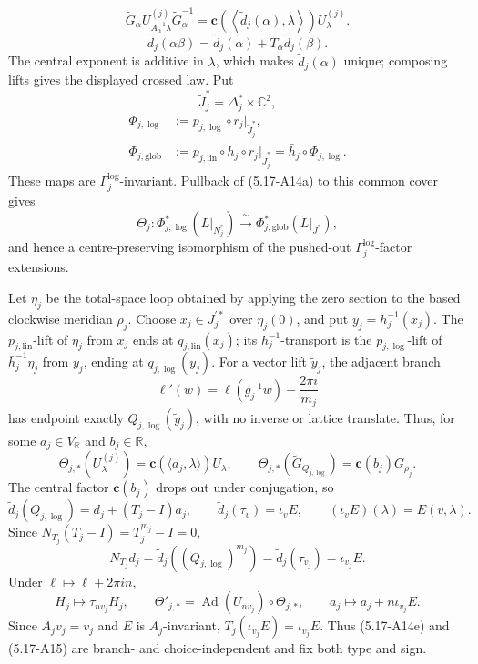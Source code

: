{\[
 \widetilde G_\alpha
 U_{A_\alpha^{-1}\lambda}^{(j)}\widetilde G_\alpha^{-1}
 =\mathbf c\!\left(\left\langle\widetilde d_j(\alpha),\lambda\right\rangle\right)
 U_\lambda^{(j)}.
\tag{5.17-A14c}
\]
\[
 \widetilde d_j(\alpha\beta)
 =\widetilde d_j(\alpha)+T_\alpha\widetilde d_j(\beta).
\tag{5.17-A14d}
\]
The central exponent is additive in \(\lambda\), which makes
\(\widetilde d_j(\alpha)\) unique; composing lifts gives the displayed
crossed law.  Put
\[
 \widetilde J_j^*=\Delta_j^*\times\mathbb C^2,
\]
\[
\begin{aligned}
 \Phi_{j,\log}
  &:=p_{j,\log}\circ r_j|_{\widetilde J_j^*},\\
 \Phi_{j,\mathrm{glob}}
  &:=p_{j,\mathrm{lin}}\circ h_j\circ r_j|_{\widetilde J_j^*}
   =\bar h_j\circ\Phi_{j,\log}.
\end{aligned}
\]
These maps are \(\Gamma_j^{\log}\)-invariant.  Pullback of
\textup{(5.17-A14a)} to this common cover gives
\[
 \Theta_j:
 \Phi_{j,\log}^*(L|_{N_j^*})
 \xrightarrow{\ \sim\ }
 \Phi_{j,\mathrm{glob}}^*(L|_{J^*}),
\]
and hence a centre-preserving isomorphism of the pushed-out
\(\Gamma_j^{\log}\)-factor extensions.

Let \(\eta_j\) be the total-space loop obtained by applying the zero section
to the based clockwise meridian \(\rho_j\).  Choose
\(x_j\in J_j^{\prime *}\) over \(\eta_j(0)\), and put
\(y_j=h_j^{-1}(x_j)\).  The \(p_{j,\mathrm{lin}}\)-lift of \(\eta_j\)
from \(x_j\) ends at
\(q_{j,\mathrm{lin}}(x_j)\); its \(h_j^{-1}\)-transport is the
\(p_{j,\log}\)-lift of \(\bar h_j^{-1}\eta_j\) from \(y_j\), ending at
\(q_{j,\log}(y_j)\).
For a vector lift \(\widetilde y_j\), the adjacent branch
\[
 \ell'(w)=\ell(g_j^{-1}w)-\frac{2\pi i}{m_j}
\]
has endpoint exactly \(Q_{j,\log}(\widetilde y_j)\), with no inverse or
lattice translate.  Thus, for some \(a_j\in V_{\mathbb R}\) and
\(b_j\in\mathbb R\),
\[
 \Theta_{j,*}(U_\lambda^{(j)})
 =\mathbf c(\langle a_j,\lambda\rangle)U_\lambda,\qquad
 \Theta_{j,*}(\widetilde G_{Q_{j,\log}})
 =\mathbf c(b_j)G_{\rho_j}.
\]
The central factor \(\mathbf c(b_j)\) drops out under conjugation, so
\[
 \widetilde d_j(Q_{j,\log})=d_j+(T_j-I)a_j,
 \qquad
 \widetilde d_j(\tau_v)=\iota_vE,
 \qquad (\iota_vE)(\lambda)=E(v,\lambda).
\]
Since \(N_{T_j}(T_j-I)=T_j^{m_j}-I=0\),
\[
 N_{T_j}d_j
 =\widetilde d_j((Q_{j,\log})^{m_j})
 =\widetilde d_j(\tau_{v_j})=\iota_{v_j}E.
\tag{5.17-A15}
\]
Under \(\ell\mapsto\ell+2\pi in\),
\[
 H_j\longmapsto\tau_{nv_j}H_j,\qquad
 \Theta'_{j,*}=\operatorname{Ad}(U_{nv_j})\circ\Theta_{j,*},\qquad
 a_j\longmapsto a_j+n\iota_{v_j}E.
\]
Since \(A_jv_j=v_j\) and \(E\) is \(A_j\)-invariant,
\(T_j(\iota_{v_j}E)=\iota_{v_j}E\).  Thus (5.17-A14e) and
(5.17-A15) are branch- and choice-independent and fix both type and sign.
}

